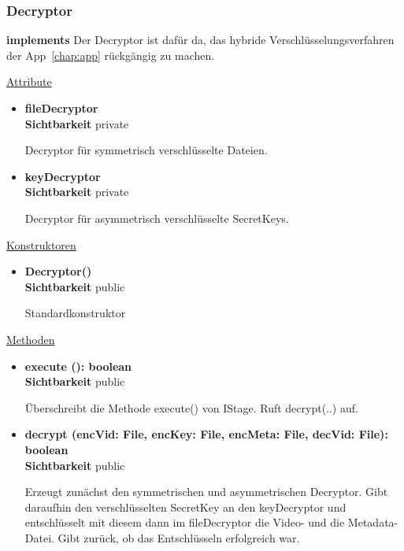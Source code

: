 \subsubsection{Decryptor} \label{service:klasse:Decryptor}
\textbf{implements}  \newline
Der Decryptor ist dafür da, das hybride Verschlüsselungsverfahren der App~\eqref{chap:app} rückgängig zu machen.\newline

\underline{Attribute}
\begin{itemize}
\itemsep0pt
\item \textbf{fileDecryptor} \hfill \\
\textbf{Sichtbarkeit} private

Decryptor für symmetrisch verschlüsselte Dateien.

\item \textbf{keyDecryptor} \hfill \\
\textbf{Sichtbarkeit} private

Decryptor für asymmetrisch verschlüsselte SecretKeys.

\end{itemize}

\underline{Konstruktoren}
\begin{itemize}
\itemsep0pt
\item \textbf{Decryptor()} \hfill\\
\textbf{Sichtbarkeit} public

Standardkonstruktor
\end{itemize}

\underline{Methoden}
\begin{itemize}
\itemsep0pt
\item \textbf{execute (): boolean}\hfill\\
\textbf{Sichtbarkeit} public

Überschreibt die Methode execute() von IStage. Ruft decrypt(..) auf.

\item \textbf{decrypt (encVid: File, encKey: File, 
encMeta: File, decVid: File): boolean}\hfill\\
\textbf{Sichtbarkeit} public

Erzeugt zunächst den symmetrischen und asymmetrischen Decryptor. Gibt daraufhin den verschlüsselten SecretKey an den keyDecryptor und entschlüsselt mit diesem dann im fileDecryptor die Video- und die Metadata-Datei. Gibt zurück, ob das Entschlüsseln erfolgreich war.

\end{itemize}